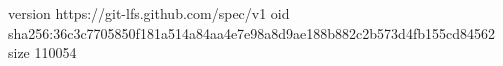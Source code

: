 version https://git-lfs.github.com/spec/v1
oid sha256:36c3c7705850f181a514a84aa4e7e98a8d9ae188b882c2b573d4fb155cd84562
size 110054
